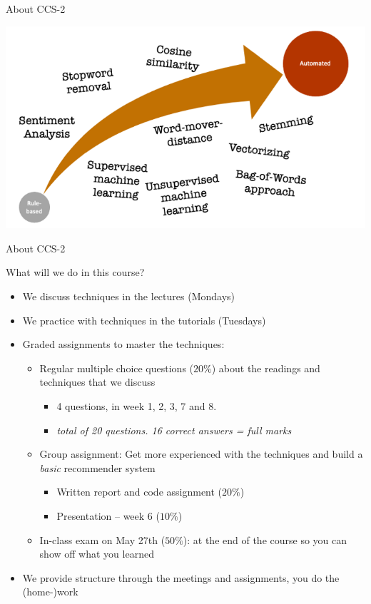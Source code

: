 \documentclass[handout]{beamer}
\begin{document}
\begin{frame}{About CCS-2}
	\begin{center}
		\includegraphics[width=\linewidth,height=\textheight,keepaspectratio]{../pictures/Roadmap_terms.png} 
	\end{center}
\end{frame}


\begin{frame}{About CCS-2} 

What will we do in this course?	
	\begin{itemize}[<+->]
		\item We discuss techniques in the lectures (Mondays)
		\item We practice with techniques in the tutorials (Tuesdays)
		\item Graded assignments to master the techniques:
		\begin{itemize}
			\item Regular multiple choice questions (\(20\%\)) about the readings and techniques that we discuss
			\begin{itemize}
				\item 4 questions, in week 1, 2, 3, 7 and 8. 
				\item \emph{total of 20 questions. 16 correct answers = full marks}
			\end{itemize}
			\item Group assignment: Get more experienced with the techniques and build a \emph{basic} recommender system
			\begin{itemize}
				\item Written report and code assignment (\(20\%\))
                    \item Presentation -- week 6 (\(10\%\))
			\end{itemize}
			\item In-class exam on May 27th (\(50\%\)): at the end of the course so you can show off what you learned
		\end{itemize}
		\item We provide structure through the meetings and assignments, you do the (home-)work
	\end{itemize}
	
\end{frame}
\end{document}
